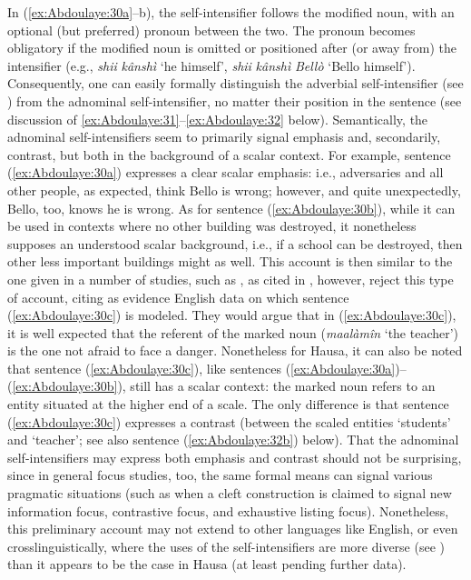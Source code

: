 \documentclass[output=paper]{langscibook}
\begin{document}
In (\ref{ex:Abdoulaye:30a}--b), the self-intensifier follows the modified noun, with an optional (but preferred) pronoun between the two. The pronoun becomes obligatory if the modified noun is omitted or positioned after (or away from) the intensifier (e.g., \textit{shii} \textit{kânshì} ‘he himself’, \textit{shii} \textit{kânshì} \textit{Bellò} ‘Bello himself’). Consequently, one can easily formally distinguish the adverbial self-intensifier (see ) from the adnominal self-intensifier, no matter their position in the sentence (see discussion of \ref{ex:Abdoulaye:31}--\ref{ex:Abdoulaye:32} below). Semantically, the adnominal self-intensifiers seem to primarily signal emphasis and, secondarily, contrast, but both in the background of a scalar context. For example, sentence (\ref{ex:Abdoulaye:30a}) expresses a clear scalar emphasis: i.e., adversaries and all other people, as expected, think Bello is wrong; however, and quite unexpectedly, Bello, too, knows he is wrong. As for sentence (\ref{ex:Abdoulaye:30b}), while it can be used in contexts where no other building was destroyed, it nonetheless supposes an understood scalar background, i.e., if a school can be destroyed, then other less important buildings might as well. This account is then similar to the one given in a number of studies, such as \citet{EdmondsonPlank1978, Primus1992, Kibrik1995}, as cited in \citet[47--48]{KoenigSiemund2000}, however, reject this type of account, citing as evidence English data on which sentence (\ref{ex:Abdoulaye:30c}) is modeled. They would argue that in (\ref{ex:Abdoulaye:30c}), it is well expected that the referent of the marked noun (\textit{maalàmîn} ‘the teacher’) is the one not afraid to face a danger. Nonetheless for Hausa, it can also be noted that sentence (\ref{ex:Abdoulaye:30c}), like sentences (\ref{ex:Abdoulaye:30a})--(\ref{ex:Abdoulaye:30b}), still has a scalar context: the marked noun refers to an entity situated at the higher end of a scale. The only difference is that sentence (\ref{ex:Abdoulaye:30c}) expresses a contrast (between the scaled entities ‘students’ and ‘teacher’; see also sentence (\ref{ex:Abdoulaye:32b}) below). That the adnominal self-intensifiers may express both emphasis and contrast should not be surprising, since in general focus studies, too, the same formal means can signal various pragmatic situations (such as when a cleft construction is claimed to signal new information focus, contrastive focus, and exhaustive listing focus). Nonetheless, this preliminary account may not extend to other languages like English, or even crosslinguistically, where the uses of the self-intensifiers are more diverse (see \citealt[224]{KoenigGast2006}) than it appears to be the case in Hausa (at least pending further data).
\end{document}
